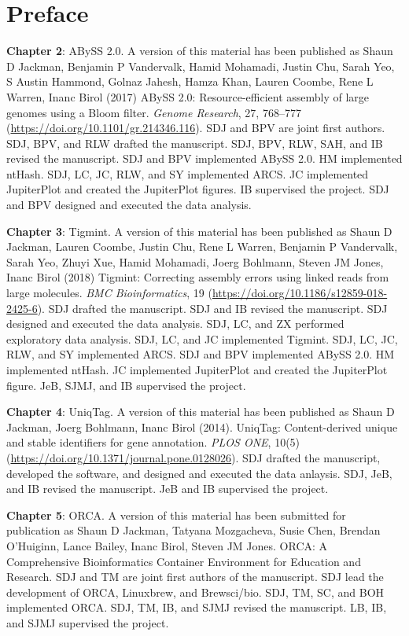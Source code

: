 \documentclass[
  12pt,
  oneside,
  openany]{book}
\begin{document}
\newpage

\hypertarget{preface}{%
\section*{Preface}\label{preface}}

\textbf{Chapter 2}: ABySS 2.0. A version of this material has been published as Shaun D Jackman, Benjamin P Vandervalk, Hamid Mohamadi, Justin Chu, Sarah Yeo, S Austin Hammond, Golnaz Jahesh, Hamza Khan, Lauren Coombe, Rene L Warren, Inanc Birol (2017) ABySS 2.0: Resource-efficient assembly of large genomes using a Bloom filter. \emph{Genome Research}, 27, 768--777 (\url{https://doi.org/10.1101/gr.214346.116}). SDJ and BPV are joint first authors. SDJ, BPV, and RLW drafted the manuscript. SDJ, BPV, RLW, SAH, and IB revised the manuscript. SDJ and BPV implemented ABySS 2.0. HM implemented ntHash. SDJ, LC, JC, RLW, and SY implemented ARCS. JC implemented JupiterPlot and created the JupiterPlot figures. IB supervised the project. SDJ and BPV designed and executed the data analysis.

\textbf{Chapter 3}: Tigmint. A version of this material has been published as Shaun D Jackman, Lauren Coombe, Justin Chu, Rene L Warren, Benjamin P Vandervalk, Sarah Yeo, Zhuyi Xue, Hamid Mohamadi, Joerg Bohlmann, Steven JM Jones, Inanc Birol (2018) Tigmint: Correcting assembly errors using linked reads from large molecules. \emph{BMC Bioinformatics}, 19 (\url{https://doi.org/10.1186/s12859-018-2425-6}). SDJ drafted the manuscript. SDJ and IB revised the manuscript. SDJ designed and executed the data analysis. SDJ, LC, and ZX performed exploratory data analysis. SDJ, LC, and JC implemented Tigmint. SDJ, LC, JC, RLW, and SY implemented ARCS. SDJ and BPV implemented ABySS 2.0. HM implemented ntHash. JC implemented JupiterPlot and created the JupiterPlot figure. JeB, SJMJ, and IB supervised the project.

\textbf{Chapter 4}: UniqTag. A version of this material has been published as Shaun D Jackman, Joerg Bohlmann, Inanc Birol (2014). UniqTag: Content-derived unique and stable identifiers for gene annotation. \emph{PLOS ONE}, 10(5) (\url{https://doi.org/10.1371/journal.pone.0128026}). SDJ drafted the manuscript, developed the software, and designed and executed the data anlaysis. SDJ, JeB, and IB revised the manuscript. JeB and IB supervised the project.

\textbf{Chapter 5}: ORCA. A version of this material has been submitted for publication as Shaun D Jackman, Tatyana Mozgacheva, Susie Chen, Brendan O'Huiginn, Lance Bailey, Inanc Birol, Steven JM Jones. ORCA: A Comprehensive Bioinformatics Container Environment for Education and Research. SDJ and TM are joint first authors of the manuscript. SDJ lead the development of ORCA, Linuxbrew, and Brewsci/bio. SDJ, TM, SC, and BOH implemented ORCA. SDJ, TM, IB, and SJMJ revised the manuscript. LB, IB, and SJMJ supervised the project.
\end{document}
